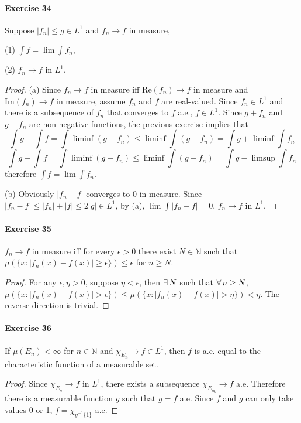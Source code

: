 \paragraph{Exercise 34}
Suppose $|f_n|\le g\in L^1$ and $f_n\to f$ in measure,
\par (1) $\int f=\lim\int f_n$,
\par (2) $f_n\to f$ in $L^1$.
\begin{proof}
    \par (a) Since $f_n\to f$ in measure iff $\mathrm{Re}(f_n)\to f$ in measure and $\mathrm{Im}(f_n)\to f$ in measure, assume $f_n$ and $f$ are real-valued. Since $f_n\in L^1$ and there is a subsequence of $f_n$ that converges to $f$ a.e., $f\in L^1$. Since $g+f_n$ and $g-f_n$ are non-negative functions, the previous exercise implies that
    $$
    \int g+\int f=\int\liminf(g+f_n)\le\liminf\int(g+f_n)=\int g+\liminf\int f_n
    $$
    $$
    \int g-\int f=\int\liminf(g-f_n)\le\liminf\int(g-f_n)=\int g-\limsup\int f_n
    $$
    therefore $\int f=\lim\int f_n$.
    \par (b) Obviously $|f_n-f|$ converges to $0$ in measure. Since $|f_n-f|\le|f_n|+|f|\le 2|g|\in L^1$, by (a), $\lim\int|f_n-f|=0$, $f_n\to f$ in $L^1$.
\end{proof}
\paragraph{Exercise 35}
$f_n\to f$ in measure iff for every $\epsilon>0$ there exist $N\in\mathbb{N}$ such that $\mu(\{x:|f_n(x)-f(x)|\ge\epsilon\})\le\epsilon$ for $n\ge N$.
\begin{proof}
    For any $\epsilon,\eta>0$, suppose $\eta<\epsilon$, then $\exists\, N$ such that $\forall\, n\ge N$, $\mu(\{x:|f_n(x)-f(x)|>\epsilon\})\le\mu(\{x:|f_n(x)-f(x)|>\eta\})<\eta$. The reverse direction is trivial.
\end{proof}
\paragraph{Exercise 36}
If $\mu(E_n)<\infty$ for $n\in\mathbb{N}$ and $\chi_{E_n}\to f\in L^{1}$, then $f$ is a.e. equal to the characteristic function of a measurable set.
\begin{proof}
    Since $\chi_{E_n}\to f$ in $L^1$, there exists a subsequence $\chi_{E_{n_k}}\to f$ a.e. Therefore there is a measurable function $g$ such that $g=f$ a.e. Since $f$ and $g$ can only take values 0 or 1, $f=\chi_{g^{-1}\{1\}}$ a.e.
\end{proof}
